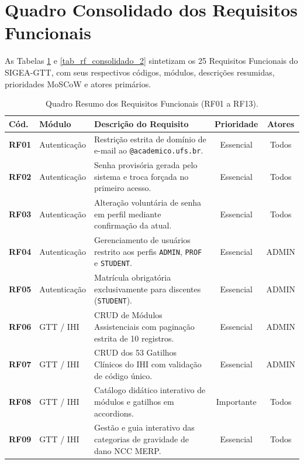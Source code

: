 \section{Quadro Consolidado dos Requisitos Funcionais}
\label{sec_quadro_consolidado_rf}

As Tabelas \ref{tab_rf_consolidado_1} e \ref{tab_rf_consolidado_2} sintetizam os 25 Requisitos Funcionais do SIGEA-GTT, com seus respectivos códigos, módulos, descrições resumidas, prioridades MoSCoW e atores primários.

\begin{table}[htb]
\centering
\small
\caption{Quadro Resumo dos Requisitos Funcionais (RF01 a RF13).}
\label{tab_rf_consolidado_1}
\begin{tabularx}{\textwidth}{l l X c c}
\toprule
\textbf{Cód.} & \textbf{Módulo} & \textbf{Descrição do Requisito} & \textbf{Prioridade} & \textbf{Atores} \\
\midrule
\textbf{RF01} & Autenticação & Restrição estrita de domínio de e-mail ao \texttt{@academico.ufs.br}. & Essencial & Todos \\
\midrule
\textbf{RF02} & Autenticação & Senha provisória gerada pelo sistema e troca forçada no primeiro acesso. & Essencial & Todos \\
\midrule
\textbf{RF03} & Autenticação & Alteração voluntária de senha em perfil mediante confirmação da atual. & Essencial & Todos \\
\midrule
\textbf{RF04} & Autenticação & Gerenciamento de usuários restrito aos perfis \texttt{ADMIN}, \texttt{PROF} e \texttt{STUDENT}. & Essencial & ADMIN \\
\midrule
\textbf{RF05} & Autenticação & Matrícula obrigatória exclusivamente para discentes (\texttt{STUDENT}). & Essencial & ADMIN \\
\midrule
\textbf{RF06} & GTT / IHI & CRUD de Módulos Assistenciais com paginação estrita de 10 registros. & Essencial & ADMIN \\
\midrule
\textbf{RF07} & GTT / IHI & CRUD dos 53 Gatilhos Clínicos do IHI com validação de código único. & Essencial & ADMIN \\
\midrule
\textbf{RF08} & GTT / IHI & Catálogo didático interativo de módulos e gatilhos em accordions. & Importante & Todos \\
\midrule
\textbf{RF09} & GTT / IHI & Gestão e guia interativo das categorias de gravidade de dano NCC MERP. & Essencial & Todos \\

\end{tabularx}
\end{table}
